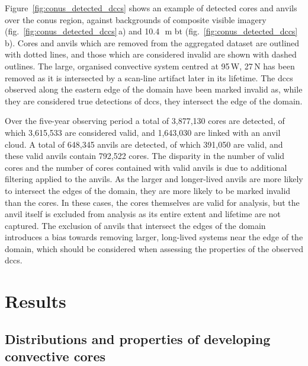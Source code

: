 Figure~\ref{fig:conus_detected_dccs} shows an example of detected cores and anvils over the \acrshort{conus} region, against backgrounds of composite visible imagery (fig.~\ref{fig:conus_detected_dccs}\,a) and 10.4\,\unit{\mu m} \acrshort{bt} (fig.~\ref{fig:conus_detected_dccs}\,b).
Cores and anvils which are removed from the aggregated dataset are outlined with dotted lines, and those which are considered invalid are shown with dashed outlines.
The large, organised convective system centred at 95\,\textdegree W, 27\,\textdegree N has been removed as it is intersected by a scan-line artifact later in its lifetime.
The \acrshort{dcc}s observed along the eastern edge of the domain have been marked invalid as, while they are considered true detections of \acrshort{dcc}s, they intersect the edge of the domain.

Over the five-year observing period a total of 3,877,130 cores are detected, of which 3,615,533 are considered valid, and 1,643,030 are linked with an anvil cloud. 
A total of 648,345 anvils are detected, of which 391,050 are valid, and these valid anvils contain 792,522 cores.
The disparity in the number of valid cores and the number of cores contained with valid anvils is due to additional filtering applied to the anvils.
As the larger and longer-lived anvils are more likely to intersect the edges of the domain, they are more likely to be marked invalid than the cores.
In these cases, the cores themselves are valid for analysis, but the anvil itself is excluded from analysis as its entire extent and lifetime are not captured.
The exclusion of anvils that intersect the edges of the domain introduces a bias towards removing larger, long-lived systems near the edge of the domain, which should be considered when assessing the properties of the observed \acrshort{dcc}s.


\section{Results}


\subsection{Distributions and properties of developing convective cores} \label{sec:core_properties}

